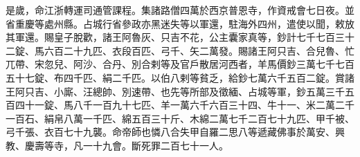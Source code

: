 \begin{pinyinscope}
 是歲，命江浙轉運司通管課程。集諸路僧四萬於西京普恩寺，作資戒會七日夜。並省重慶等處州縣。占城行省參政亦黑迷失等以軍還，駐海外四州，遣使以聞，敕放其軍還。賜皇子脫歡，諸王阿魯灰、只吉不花，公主囊家真等，鈔計七千七百三十二錠、馬六百二十九匹、衣段百匹、弓千、矢二萬發。賜諸王阿只吉、合兒魯、忙兀帶、宋忽兒、阿沙、合丹、別合剌等及官戶散居河西者，羊馬價鈔三萬七千七百五十七錠、布四千匹、絹二千匹。以伯八剌等貧乏，給鈔七萬六千五百二錠。賞諸王阿只吉、小廝、汪總帥、別速帶、也先等所部及徵緬、占城等軍，鈔五萬三千五百四十一錠、馬八千一百九十七匹、羊一萬六千六百三十四、牛十一、米二萬二千一百石、絹帛八萬一千匹、綿五百三十斤、木綿二萬七千二百七十九匹、甲千被、弓千張、衣百七十九襲。命帝師也憐八合失甲自羅二思八等遞藏佛事於萬安、興教、慶壽等寺，凡一十九會。斷死罪二百七十一人。



\end{pinyinscope}
